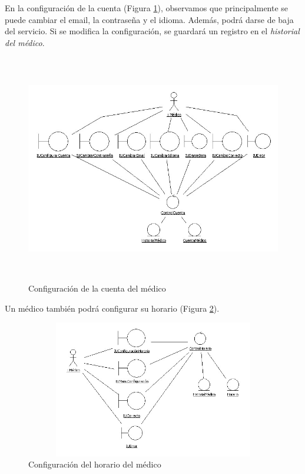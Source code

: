 \documentclass[a4paper,oneside,11pt]{book}
\begin{document}
		En la configuración de la cuenta (Figura \ref{fig:col_clase3}), observamos que principalmente se puede cambiar el email, la contraseña y el idioma. Además, podrá darse de baja del servicio. Si se modifica la configuración, se guardará un registro en el \textit{historial del médico}.
		\begin{figure}[H]
		  \centering
		    \includegraphics[width=16cm, height=10cm]{img/jpg/clases/3_MedicoConfiguracionCuenta.jpg}
		  \caption{Configuración de la cuenta del médico}
		  \label{fig:col_clase3}
		\end{figure}
		
		Un médico también podrá configurar su horario (Figura \ref{fig:col_clase4}).
		\begin{figure}[H]
		  \centering
		    \includegraphics[width=12cm, height=6cm]{img/jpg/clases/4_MedicoConfiguracionHorario.jpg}
		  \caption{Configuración del horario del médico}
		  \label{fig:col_clase4}
		\end{figure}
\end{document}
